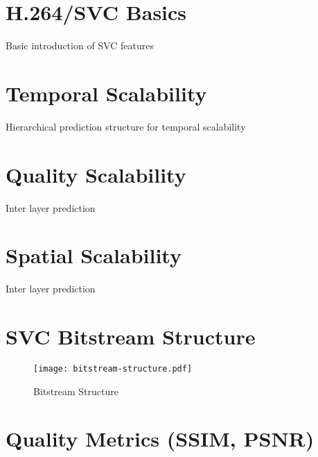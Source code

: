 
\section{H.264/SVC Basics}
Basic introduction of SVC features

\section{Temporal Scalability}
Hierarchical prediction structure for temporal scalability

\section{Quality Scalability}
Inter layer prediction

\section{Spatial Scalability}
Inter layer prediction

\section{SVC Bitstream Structure}
    \begin{figure}[H]
        \centering
        \texttt{[image: bitstream-structure.pdf]}
        \caption{Bitstream Structure}
        \label{fig:bitstream_structure}
    \end{figure}

\section{Quality Metrics (SSIM, PSNR)}

